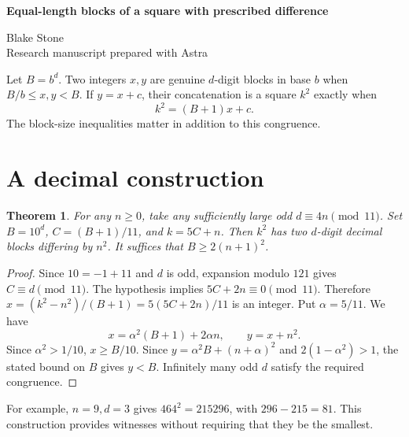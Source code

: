 \documentclass[11pt,letterpaper]{article}
\newtheorem{theorem}{Theorem}
\begin{document}
\thispagestyle{plain}
\begin{center}
{\LARGE\bfseries Equal-length blocks of a square with prescribed difference\par}
\vspace{0.5em}
Blake Stone\\
{\small Research manuscript prepared with Astra}
\end{center}

\begin{abstract}
For every nonnegative \(n\) and every base \(b\ge2\), infinitely many squares have two equal-length blocks differing by exactly \(n^2\). The least square root has order \(n^2\). This proves Michel Lagneau's existence conjecture for OEIS A236383. In decimal, twice a square also occurs as a difference infinitely often, whereas a difference of seven is impossible at every width.
\end{abstract}

Let \(B=b^d\). Two integers \(x,y\) are genuine \(d\)-digit blocks in base \(b\) when \(B/b\le x,y<B\). If \(y=x+c\), their concatenation is a square \(k^2\) exactly when
\[
                   k^2=(B+1)x+c.
\]
The block-size inequalities matter in addition to this congruence.

\section{A decimal construction}
\begin{theorem}
For any \(n\ge0\), take any sufficiently large odd \(d\equiv4n\pmod{11}\). Set \(B=10^d\), \(C=(B+1)/11\), and \(k=5C+n\). Then \(k^2\) has two \(d\)-digit decimal blocks differing by \(n^2\). It suffices that \(B\ge2(n+1)^2\).
\end{theorem}
\begin{proof}
Since \(10=-1+11\) and \(d\) is odd, expansion modulo \(121\) gives \(C\equiv d\pmod{11}\). The hypothesis implies \(5C+2n\equiv0\pmod{11}\). Therefore \(x=(k^2-n^2)/(B+1)=5(5C+2n)/11\) is an integer. Put \(\alpha=5/11\). We have
\[
 x=\alpha^2(B+1)+2\alpha n,\qquad y=x+n^2.
\]
Since \(\alpha^2>1/10\), \(x\ge B/10\). Since \(y=\alpha^2B+(n+\alpha)^2\) and \(2(1-\alpha^2)>1\), the stated bound on \(B\) gives \(y<B\). Infinitely many odd \(d\) satisfy the required congruence.
\end{proof}

For example, \(n=9,d=3\) gives \(464^2=215296\), with \(296-215=81\). This construction provides witnesses without requiring that they be the smallest.
\end{document}
